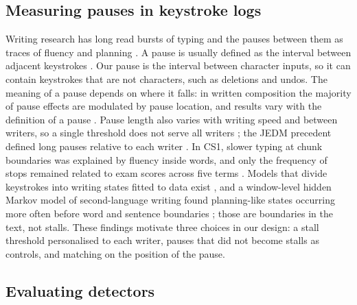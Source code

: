 \subsection{Measuring pauses in keystroke logs}

Writing research has long read bursts of typing and the pauses between them as traces of fluency and planning
\cite{chenoweth2001fluency,leijten2013keystroke}. A pause is usually defined as the interval between adjacent keystrokes
\cite{guo2018basic,baaijen2012keystroke}. Our
pause is the interval between character inputs, so it can contain keystrokes that are not characters, such as
deletions and undos. The meaning of a pause depends on where it falls: in written composition the majority of pause
effects are modulated by pause location, and results vary with the definition of a pause
\cite{medimorec2017pauses,immonen2006translation,fuchs2016prosodic}. Pause length also varies with writing speed and
between writers, so a single threshold does not serve all writers
\cite{chenu2014interword,litvinova2024investigating,guo2018basic,roeser2024disfluencies,hall2024constructing}; the JEDM
precedent defined long pauses relative to each writer \cite{guo2020scenario}. In CS1, slower typing at chunk
boundaries was explained by fluency inside words, and only the frequency of stops remained related to exam scores
across five terms \cite{koutcheme2026keystroke,shrestha2022pausing,edwards2020programming}. Models that divide keystrokes
into writing states fitted to data exist \cite{guo2020scenario,guo2018basic}, and a window-level hidden Markov model of
second-language writing found planning-like states occurring more often before word and sentence boundaries
\cite{garcesmanzanera2026modeling}; those are boundaries in the text, not stalls. These findings motivate three choices
in our design: a stall threshold personalised to each writer, pauses that did not become stalls as controls, and
matching on the position of the pause.

\subsection{Evaluating detectors}

